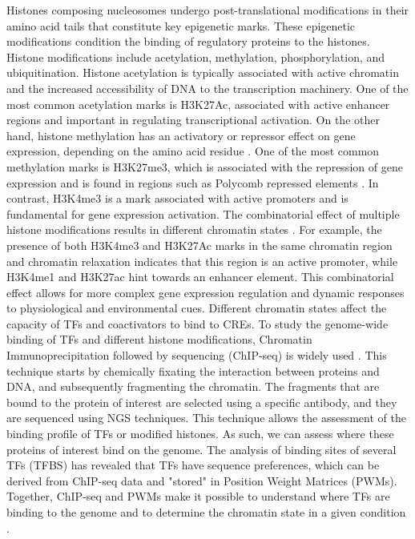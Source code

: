 Histones composing nucleosomes undergo post-translational modifications in their amino acid tails that constitute key epigenetic marks. These epigenetic modifications condition the binding of regulatory proteins to the histones. Histone modifications include acetylation, methylation, phosphorylation, and ubiquitination. Histone acetylation is typically associated with active chromatin and the increased accessibility of DNA to the transcription machinery. One of the most common acetylation marks is H3K27Ac, associated with active enhancer regions and important in regulating transcriptional activation. On the other hand, histone methylation has an activatory or repressor effect on gene expression, depending on the amino acid residue \parencite{barski_high-resolution_2007}. One of the most common methylation marks is H3K27me3, which is associated with the repression of gene expression and is found in regions such as Polycomb repressed elements \parencite{guo_polycomb_2021}. In contrast, H3K4me3 is a mark associated with active promoters and is fundamental for gene expression activation. The combinatorial effect of multiple histone modifications results in different chromatin states \parencite{rada-iglesias_unique_2011, haberle_eukaryotic_2018}. For example, the presence of both H3K4me3 and H3K27Ac marks in the same chromatin region and chromatin relaxation indicates that this region is an active promoter, while H3K4me1 and H3K27ac hint towards an enhancer element. This combinatorial effect allows for more complex gene expression regulation and dynamic responses to physiological and environmental cues. Different chromatin states affect the capacity of TFs and coactivators to bind to CREs. To study the genome-wide binding of TFs and different histone modifications, Chromatin Immunoprecipitation followed by sequencing (ChIP-seq) is widely used \parencite{johnson_genome-wide_2007, massie_chromatin_2009, kaufmann_chromatin_2010}. This technique starts by chemically fixating the interaction between proteins and DNA, and subsequently fragmenting the chromatin. The fragments that are bound to the protein of interest are selected using a specific antibody, and they are sequenced using NGS techniques. This technique allows the assessment of the binding profile of TFs or modified histones. As such, we can assess where these proteins of interest bind on the genome. The analysis of binding sites of several TFs (TFBS) has revealed that TFs have sequence preferences, which can be derived from ChIP-seq data and "stored" in Position Weight Matrices (PWMs). Together, ChIP-seq and PWMs make it possible to understand where TFs are binding to the genome and to determine the chromatin state in a given condition \parencite{stormo_determining_2010, aerts_chapter_2012}.

